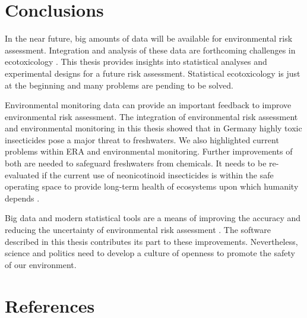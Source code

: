 \clearpage
\section{Conclusions}
In the near future, big amounts of data will be available for environmental risk assessment.
Integration and analysis of these data are forthcoming challenges in  ecotoxicology \citep{dafforn_big_2015, van_den_brink_new_2016}. 
This thesis provides insights into statistical analyses and experimental designs for a future risk assessment. Statistical ecotoxicology is just at the beginning and many problems are pending to be solved. 

Environmental monitoring data can provide an important feedback to improve environmental risk assessment. 
The integration of environmental risk assessment and environmental monitoring in this thesis showed that in Germany highly toxic insecticides pose a major threat to freshwaters.
We also highlighted current problems within ERA and environmental monitoring. 
Further improvements of both are needed to safeguard freshwaters from chemicals.
It needs to be re-evaluated if the current use of neonicotinoid insecticides is within the safe operating space to provide long-term health of ecosystems upon which humanity depends \citep{rockstrom_safe_2009}. 

Big data and modern statistical tools are a means of improving the accuracy and reducing the uncertainty of environmental risk assessment \citep{van_den_brink_new_2016}. 
The software described in this thesis contributes its part to these improvements.
Nevertheless, science and politics need to develop a culture of openness to promote the safety of our environment. 



\clearpage
\section{References}
\printbibliography[heading=none]

